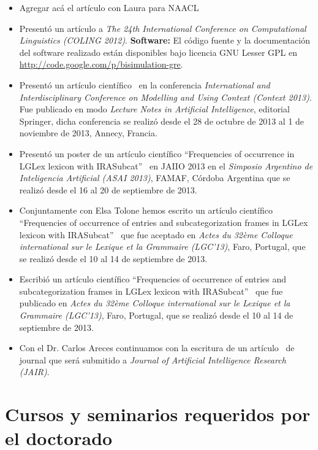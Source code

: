 \begin{itemize}
\item Agregar ac\'a el art\'iculo con Laura para NAACL
\item Present\'o un art\'iculo a \emph{The 24th International Conference on Computational Linguistics (COLING 2012)}. \textbf{Software:} El c\'odigo fuente y la documentaci\'on del software realizado est\'an disponibles bajo licencia GNU Lesser GPL en \url{http://code.google.com/p/bisimulation-gre}.
\item Present\'o un art\'iculo cient\'ifico~\cite{benotti-altamirano-context2013} en la conferencia \emph{International and Interdisciplinary Conference on Modelling and Using Context (Context 2013)}. Fue publicado en modo \emph{Lecture Notes in Artificial Intelligence}, editorial Springer, dicha conferencia se realiz\'o desde el 28 de octubre de 2013 al 1 de noviembre de 2013, Annecy, Francia.
\item Present\'o un poster de un art\'iculo cient\'ifico ``Frequencies of occurrence in LGLex lexicon with IRASubcat''~\cite{tolone-altamirano} en JAIIO 2013 en el \emph{Simposio Argentino de Inteligencia Artificial (ASAI 2013)}, FAMAF, C\'ordoba Argentina que se realiz\'o desde el 16 al 20 de septiembre de 2013.
\item Conjuntamente con Elsa Tolone hemos escrito un art\'iculo cient\'ifico ``Frequencies of occurrence of entries and subcategorization frames in LGLex lexicon with IRASubcat''~\cite{tolone-altamirano-2} que fue aceptado en \emph{Actes du 32\`eme Colloque international sur le Lexique et la Grammaire (LGC'13)}, Faro, Portugal, que se realiz\'o desde el 10 al 14 de septiembre de 2013.
\item Escribi\'o un art\'iculo cient\'ifico ``Frequencies of occurrence of entries and subcategorization frames in LGLex lexicon with IRASubcat''~\cite{tolonealtamirano2} que fue publicado en \emph{Actes du 32\`eme Colloque international sur le Lexique et la Grammaire (LGC'13)}, Faro, Portugal, que se realiz\'o desde el 10 al 14 de septiembre de 2013.
\item Con el Dr. Carlos Areces continuamos con la escritura de un art\'iculo~\cite{benotti-altamirano-jair} de journal que ser\'a submitido a \emph{Journal of Artificial Intelligence Research (JAIR)}.
\end{itemize}


\section{Cursos y seminarios requeridos por el doctorado}

